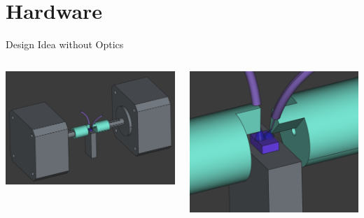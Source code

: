 \section{Hardware}

\begin{frame}{Design Idea without Optics}
	\begin{columns}
		\includegraphics[width=\textwidth]{../hardware/assembly.png}

		\includegraphics[width=\textwidth]{../hardware/sample.png}
	\end{columns}
\end{frame}